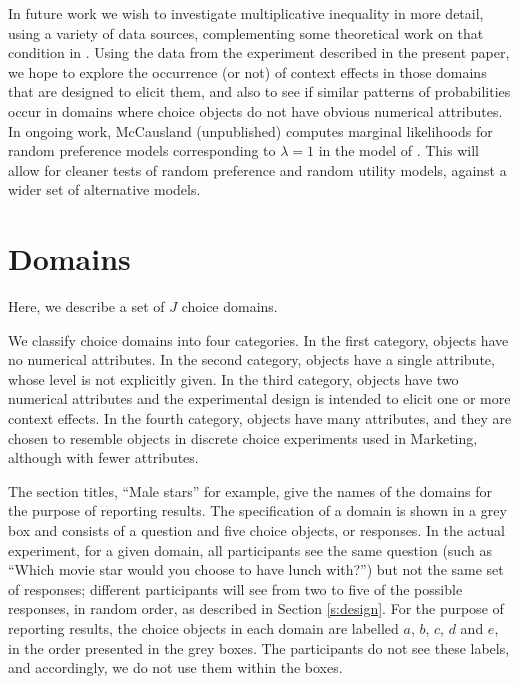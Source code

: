 \documentclass[11pt,letter]{article}
\begin{document}
In future work we wish to investigate  multiplicative inequality in more detail, using a variety of data sources, complementing some theoretical work on that condition in .
Using the data from the experiment described in the present paper, we hope to explore the occurrence (or not) of context effects in those domains that are designed to elicit them, and also to see if similar patterns of probabilities occur in domains where choice objects do not have obvious numerical attributes.
In ongoing work, McCausland (unpublished) computes marginal likelihoods for random preference models corresponding to $\lambda = 1$ in the model of .
This will allow for cleaner tests of random preference and random utility models, against a wider set of alternative models.

\appendix


\section{Domains}\label{s:domains}

Here, we describe a set of $J$ choice domains.

We classify choice domains into four categories.
In the first category, objects have no numerical attributes.
In the second category, objects have a single attribute, whose level is not explicitly given. In the third category, objects have two numerical attributes and the experimental design is intended to elicit one or more context effects.
In the fourth category, objects have many attributes, and they are chosen to resemble objects in discrete choice experiments used in Marketing, although with fewer attributes.

The section titles, ``Male stars'' for example, give the names of the domains for the purpose of reporting results.
The specification of a domain is shown in a grey box and consists of a question and five choice objects, or responses.
In the actual experiment, for a given domain, all participants see the same question (such as ``Which movie star would you choose to have lunch with?'') but not the same set of responses; different participants will see from two to five of the possible responses, in random order, as described in Section \ref{s:design}.
For the purpose of reporting results, the choice objects in each domain are labelled $a$, $b$, $c$, $d$ and $e$, in the order presented in the grey boxes.
The participants do not see these labels, and accordingly, we do not use them within the boxes.
\end{document}
